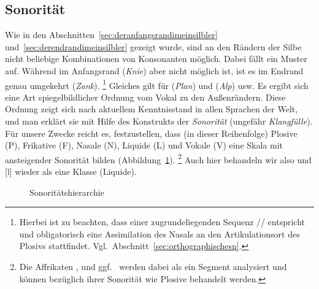 \subsection{Sonorität}
\label{sec:sonoritaet}

Wie in den Abschnitten~\ref{sec:deranfangsrandimeinsilbler} und~\ref{sec:derendrandimeinsilbler} gezeigt wurde, sind an den Rändern der Silbe nicht beliebige Kombinationen von Konsonanten möglich.
Dabei fällt ein Muster auf.
Während im Anfangsrand \zB \textipa{[kn]} (\textit{Knie}) aber nicht \textipa{[Nk]} möglich ist, ist es im Endrand genau umgekehrt (\textit{Zank}).%
\footnote{Hierbei ist zu beachten, dass \textipa{[Nk]} einer zugrundeliegenden Sequenz // entspricht und obligatorisch eine Assimilation des Nasals an den Artikulationsort des Plosivs stattfindet. Vgl.\ Abschnitt~\ref{sec:orthographischesn}.}
Gleiches gilt für \textipa{[pl]} (\textit{Plan}) und \textipa{[lp]} (\textit{Alp}) usw.
Es ergibt sich eine Art spiegelbildlicher Ordnung vom Vokal zu den Außenrändern.
Diese Ordnung zeigt sich nach aktuellem Kenntnisstand in allen Sprachen der Welt, und man erklärt sie mit Hilfe des Konstrukts der \textit{Sonorität} (ungefähr \textit{Klangfülle}).
Für unsere Zwecke reicht es, festzustellen, dass (in dieser Reihenfolge) Plosive (P), Frikative (F), Nasale (N), Liquide (L) und Vokale (V) eine Skala mit ansteigender Sonorität bilden (Abbildung~\ref{fig:sonoritaet085}).%
\footnote{Die Affrikaten \textipa{[\t{ts}]}, \textipa{[\t{pf}]} und ggf.\ \textipa{[\t{tS}]} werden dabei als ein Segment analysiert und können bezüglich ihrer Sonorität wie Plosive behandelt werden.}
Auch hier behandeln wir also \textipa{[K]} und [l] wieder als eine Klasse (Liquide).


\begin{figure}[!htbp]
  \centering
  \caption{Sonoritätshierarchie}
  \label{fig:sonoritaet085}
\end{figure}

